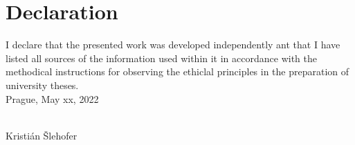 \null\vfill{}
\section*{Declaration}
I declare that the presented work was developed independently ant that I have listed all sources of the information used within it in accordance with the methodical instructions for observing the ethiclal principles in the preparation of university theses.\\[0.5cm]

Prague, May xx, 2022		%
\bigskip
\bigskip
\bigskip 

\begin{flushright}  

 \begin{minipage}{0.35\textwidth} 
  \centering   
  \dotfill\\   
  Kristián Šlehofer
 \end{minipage}
\end{flushright}